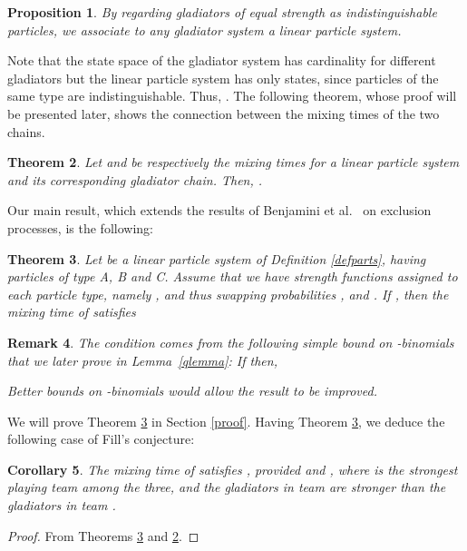 \documentclass[10 pt]{article}
\newtheorem{thm}{Theorem}[section]
\newtheorem{prop}[thm]{Proposition}
\newtheorem{remark}[thm]{Remark}
\newtheorem{con}[thm]{Corollary}
\begin{document}
\begin{prop}
By regarding gladiators of equal strength as indistinguishable particles, we associate to any gladiator system a linear particle system.
\end{prop}

Note that the state space of the gladiator system has cardinality  for  different gladiators but the linear particle system has only
 states, since particles of the same type are indistinguishable. Thus, . The following theorem,
whose proof will be presented later, shows the connection between the mixing times of the two chains.
\begin{thm}\label{reduction}
Let  and  be respectively the mixing times for a linear particle system and its corresponding gladiator chain.
Then, .
\end{thm}


Our main result, which extends the results of Benjamini et al.\ \cite{Benjamini} on exclusion processes, is the following:

\begin{thm}\label{mainthm}
Let  be a linear particle system of Definition \ref{defparts}, having particles of type A, B and C.
Assume that we have strength functions assigned to each particle type, namely , and thus swapping probabilities
,  and .
If , then the mixing time of  satisfies 

\end{thm}

\begin{remark}
The condition  comes from the following simple bound on -binomials that we later prove in Lemma~\ref{qlemma}: 
If   then, 

Better bounds on -binomials would allow the result to be improved.
\end{remark}

We will prove Theorem \ref{mainthm} in Section \ref{proof}.
Having Theorem \ref{mainthm}, we deduce the following case of Fill's conjecture: 
 
 \begin{con}
The mixing time of  satisfies , provided  and
, where  is the strongest playing team among the three, and  the gladiators in team  are stronger than the gladiators in team .
\end{con} 
 
\begin{proof}
From Theorems \ref{mainthm} and \ref{reduction}. 
\end{proof}
 
\end{document}
